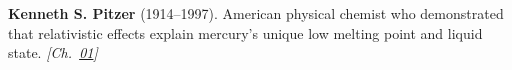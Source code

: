 \textbf{Kenneth S. Pitzer} (1914–1997). American physical chemist who demonstrated that relativistic effects explain mercury's unique low melting point and liquid state. \emph{[Ch.~\hyperref[ch:goldrelativity]{01}]}

